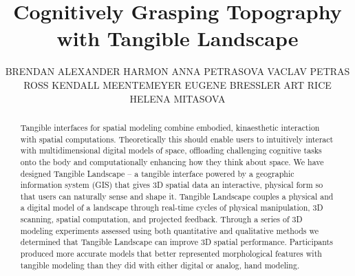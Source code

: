 \documentclass[prodmode,acmtochi]{acmsmall} %
\begin{document}

\title{Cognitively Grasping Topography with Tangible Landscape} 
% 
\author{BRENDAN ALEXANDER HARMON
ANNA PETRASOVA
VACLAV PETRAS
ROSS ​KENDALL MEENTEMEYER
EUGENE BRESSLER
ART RICE
HELENA MITASOVA
}

\begin{abstract}
%
%
Tangible interfaces for spatial modeling
combine embodied, kinaesthetic interaction with spatial computations. 
%
Theoretically this should enable users to 
intuitively interact 
with multidimensional digital models of space,
offloading challenging cognitive tasks onto the body and 
computationally enhancing how they think about space.
% 
We have designed Tangible Landscape 
-- a tangible interface powered by a geographic information system (GIS) 
that gives 3D spatial data an interactive, physical form so that 
users can naturally sense and shape it.
%
Tangible Landscape couples a physical and a digital model of a landscape
through real-time cycles of 
physical manipulation, 3D scanning, spatial computation, and projected feedback.
%
%
Through a series of 
3D modeling experiments 
assessed using both
quantitative %
and qualitative methods 
%
we determined that Tangible Landscape 
can improve 3D spatial performance. 
%
Participants produced more accurate models 
that better represented morphological features 
with tangible modeling than they did with either digital or analog, hand modeling. 
\end{abstract}
\end{document}
